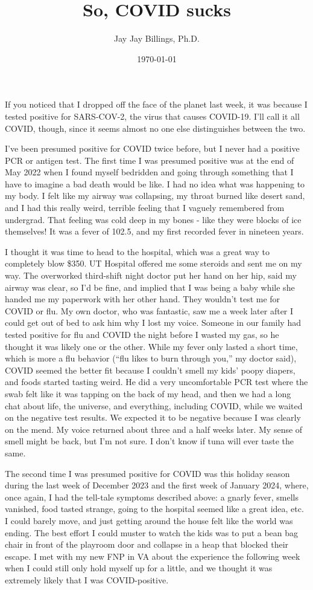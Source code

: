 \documentclass{article}
\title{So, COVID sucks}
\author{Jay Jay Billings, Ph.D.}
\date{\today}
\begin{document}
\maketitle
If you noticed that I dropped off the face of the planet last week, it was because I tested positive for SARS-COV-2, the virus that causes COVID-19. I'll call it all COVID, though, since it seems almost no one else distinguishes between the two. 

I've been presumed positive for COVID twice before, but I never had a positive PCR or antigen test. The first time I was presumed positive was at the end of May 2022 when I found myself bedridden and going through something that I have to imagine a bad death would be like. I had no idea what was happening to my body. I felt like my airway was collapsing, my throat burned like desert sand, and I had this really weird, terrible feeling that I vaguely remembered from undergrad. That feeling was cold deep in my bones - like they were blocks of ice themselves! It was a fever of 102.5, and my first recorded fever in nineteen years.

I thought it was time to head to the hospital, which was a great way to completely blow \$350. UT Hospital offered me some steroids and sent me on my way. The overworked third-shift night doctor put her hand on her hip, said my airway was clear, so I'd be fine, and implied that I was being a baby while she handed me my paperwork with her other hand. They wouldn't test me for COVID or flu. My own doctor, who was fantastic, saw me a week later after I could get out of bed to ask him why I lost my voice. Someone in our family had tested positive for flu and COVID the night before I wasted my gas, so he thought it was likely one or the other. While my fever only lasted a short time, which is more a flu behavior (``flu likes to burn through you,'' my doctor said), COVID seemed the better fit because I couldn't smell my kids' poopy diapers, and foods started tasting weird. He did a very uncomfortable PCR test where the swab felt like it was tapping on the back of my head, and then we had a long chat about life, the universe, and everything, including COVID, while we waited on the negative test results. We expected it to be negative because I was clearly on the mend. My voice returned about three and a half weeks later. My sense of smell might be back, but I'm not sure. I don't know if tuna will ever taste the same.

The second time I was presumed positive for COVID was this holiday season during the last week of December 2023 and the first week of January 2024, where, once again, I had the tell-tale symptoms described above: a gnarly fever, smells vanished, food tasted strange, going to the hospital seemed like a great idea, etc. I could barely move, and just getting around the house felt like the world was ending. The best effort I could muster to watch the kids was to put a bean bag chair in front of the playroom door and collapse in a heap that blocked their escape. I met with my new FNP in VA about the experience the following week when I could still only hold myself up for a little, and we thought it was extremely likely that I was COVID-positive. 
\end{document}
